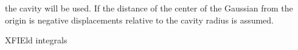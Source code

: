 \begin{keywordlist}
the cavity will be used.
If the distance of the center of the Gaussian from the origin is
negative displacements relative to the cavity radius is assumed.
\item[XFIEld integrals]

\end{keywordlist}
